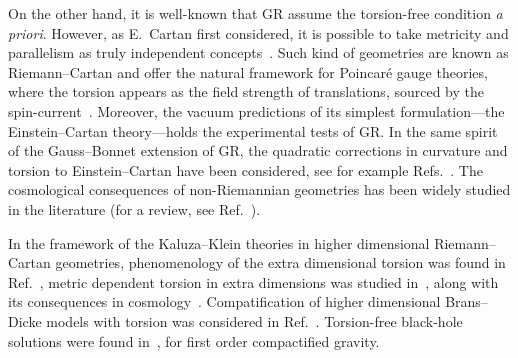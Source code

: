 \documentclass[aps,prd,12pt,superscriptaddress,showpacs,showkeys,reprint,nofootinbib]{revtex4-1}
\begin{document}
On the other hand, it is well-known that GR assume the torsion-free
condition {\it a priori}. However, as E.~Cartan first considered, it
is possible to take metricity and parallelism as truly independent
concepts~\cite{Cartan1922,*Cartan1924,*Cartan1925}. Such kind of
geometries are known as Riemann--Cartan and offer the natural
framework for Poincar\'e gauge theories, where the torsion appears as
the field strength of translations, sourced by the
spin-current~\cite{Kibble:1961ba,Sciama:1962,Hehl:1976kj}.
Moreover, the vacuum predictions of its simplest formulation---the
Einstein--Cartan theory---holds the experimental tests of GR. In the
same spirit of the Gauss--Bonnet extension of GR, the quadratic
corrections in curvature and torsion to Einstein--Cartan have been
considered, see for example Refs.~\cite{Baekler:2011jt,Fabbri:2012qr}.
The cosmological consequences of non-Riemannian geometries has been
widely studied in the literature (for a review, see
Ref.~\cite{Puetzfeld:2004yg}).

In the framework of the Kaluza--Klein theories in higher dimensional
Riemann--Cartan geometries, phenomenology of the extra dimensional
torsion was found in Ref.~\cite{Kalinowski:1980da}, metric dependent
torsion in extra dimensions was studied in~\cite{Shankar:2012vd},
along with its consequences in
cosmology~\cite{Chen:2009ep}. Compatification of higher dimensional
Brans--Dicke models with torsion was considered in
Ref.~\cite{German:1993bq}. Torsion-free black-hole solutions were
found in~\cite{Aros:2007nn}, for first order compactified gravity.
\end{document}
